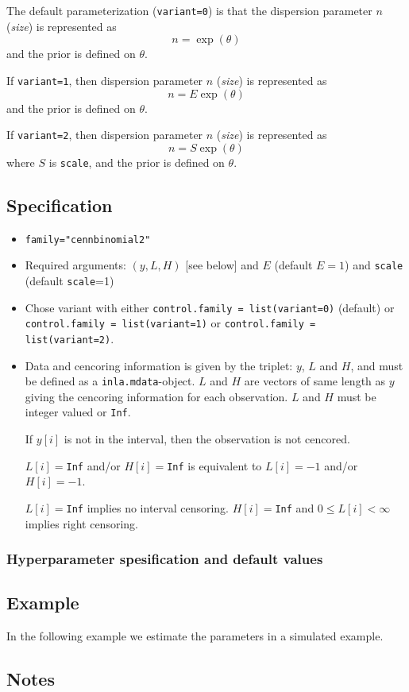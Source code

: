 \documentclass[a4paper,11pt]{article}
\begin{document}
The default parameterization (\verb|variant=0|) is that the dispersion
parameter $n$ (\emph{size}) is represented as
\begin{displaymath}
    n = \exp(\theta)
\end{displaymath}
and the prior is defined on $\theta$.

If \verb|variant=1|, then dispersion parameter $n$ (\emph{size}) is
represented as
\begin{displaymath}
    n = E\exp(\theta)
\end{displaymath}
and the prior is defined on $\theta$.

If \verb|variant=2|, then dispersion parameter $n$ (\emph{size}) is
represented as
\begin{displaymath}
    n = S\exp(\theta)
\end{displaymath}
where $S$ is \texttt{scale}, and the prior is defined on $\theta$.

\subsection*{Specification}

\begin{itemize}
\item \texttt{family="cennbinomial2"}
\item Required arguments: $(y,L,H)$ [see below] and $E$ (default
    $E=1$) and \texttt{scale} (default \texttt{scale}=1)
\item Chose variant with either
    \verb|control.family = list(variant=0)| (default) or\\
    \verb|control.family = list(variant=1)| or
    \verb|control.family = list(variant=2)|.
\item Data and cencoring information is given by the triplet: $y$, $L$
    and $H$, and must be defined as a \texttt{inla.mdata}-object. $L$
    and $H$ are vectors of same length as $y$ giving the cencoring
    information for each observation. $L$ and $H$ must be integer
    valued or \texttt{Inf}.

    If $y[i]$ is not in the interval, then the observation is not
    cencored.

    $L[i]=$\texttt{Inf} and/or $H[i]=$\texttt{Inf} is equivalent to
    $L[i]= -1$ and/or $H[i] = -1$.

    $L[i]=$\texttt{Inf} implies no interval censoring.
    $H[i]=$\texttt{Inf} and $0\leq L[i]<\infty$ implies right
    censoring.

\end{itemize}
    

\subsubsection*{Hyperparameter spesification and default values}



\subsection*{Example}

In the following example we estimate the parameters in a simulated
example. {\small  }

\subsection*{Notes}
\end{document}
